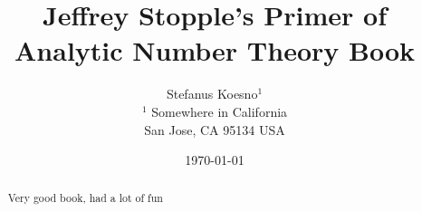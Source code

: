\documentclass[aps,preprint,preprintnumbers,nofootinbib,showpacs,prd]{revtex4-1}
\begin{document}
\title{Jeffrey Stopple's Primer of Analytic Number Theory Book}
\bigskip
\author{Stefanus Koesno$^1$\\
$^1$ Somewhere in California\\ San Jose, CA 95134 USA\\
}
%
\date{\today}
%
\begin{abstract}
Very good book, had a lot of fun

\end{abstract}
%
\maketitle

\renewcommand{\theequation}{A.\arabic{equation}}  %
\setcounter{equation}{0}  %
\end{document}
